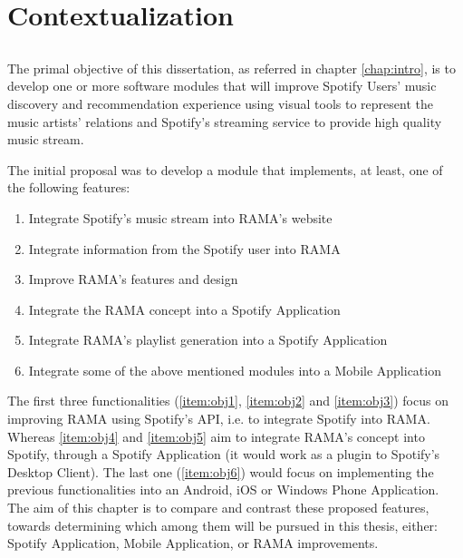 
\chapter{Contextualization}
\label{chap:chap3}

\section*{}

The primal objective of this dissertation, as referred in chapter \ref{chap:intro}, is to develop one or more software modules that will improve Spotify Users' music discovery and recommendation experience using visual tools to represent the music artists' relations and Spotify's streaming service to provide high quality music stream.

The initial proposal was to develop a module that implements, at least, one of the following features:

\begin{enumerate}
  \label{chap3:modules}
  \item \label{item:obj1} Integrate Spotify's music stream into RAMA's website
  \item \label{item:obj2} Integrate information from the Spotify user into RAMA
  \item \label{item:obj3} Improve RAMA's features and design
  \item \label{item:obj4} Integrate the RAMA concept into a Spotify Application
  \item \label{item:obj5} Integrate RAMA's playlist generation into a Spotify Application
  \item \label{item:obj6} Integrate some of the above mentioned modules into a Mobile Application
\end{enumerate}

The first three functionalities (\ref{item:obj1}, \ref{item:obj2} and \ref{item:obj3}) focus on improving RAMA using Spotify's API, i.e. to integrate Spotify into RAMA.
Whereas \ref{item:obj4} and \ref{item:obj5} aim to integrate RAMA's concept into Spotify, through a Spotify Application (it would work as a plugin to Spotify's Desktop Client).
The last one (\ref{item:obj6}) would focus on implementing the previous functionalities into an Android, iOS or Windows Phone Application.
The aim of this chapter is to compare and contrast these proposed features, towards determining which among them will be pursued in this thesis, either: Spotify Application, Mobile Application, or RAMA improvements.

